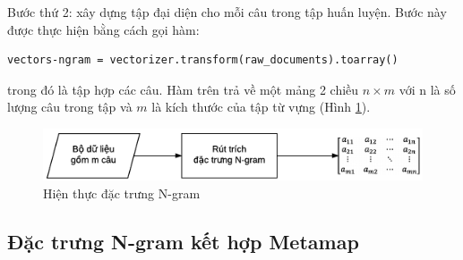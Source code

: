 Bước thứ 2: xây dựng tập  đại diện cho mỗi câu trong tập huấn luyện. Bước này được thực hiện bằng cách gọi hàm:
\begin{lstlisting}
vectors-ngram = vectorizer.transform(raw_documents).toarray()
\end{lstlisting}
trong đó  là tập hợp các câu. Hàm trên trả về một mảng 2 chiều $n \times m$ với n là số lượng câu trong tập  và $m$ là kích thước của tập từ vựng (Hình \ref{fig:hien-thuc-ngram}).
\begin{figure}[h]
\centering
\includegraphics[scale=0.8]{../hinh/hien_thuc_ngram.png}
\caption{Hiện thực đặc trưng N-gram} \label{fig:hien-thuc-ngram}
\end{figure}
\subsection*{Đặc trưng N-gram kết hợp Metamap}


